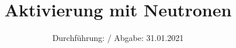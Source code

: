 

\subject{V702}
\title{Aktivierung mit Neutronen}
\date{%
  Durchführung: /
  \hspace{3em}
  Abgabe: 31.01.2021
}



\maketitle
\thispagestyle{empty}
\tableofcontents
\newpage






\printbibliography{}



